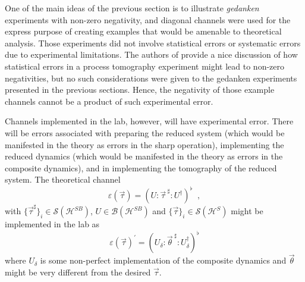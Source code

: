 One of the main ideas of the previous section is to illustrate {\em gedanken} experiments with non-zero negativity, and diagonal channels were used for the express purpose of creating examples that would be amenable to theoretical analysis.  Those experiments did not involve statistical errors or systematic errors due to experimental limitations.  The authors of \cite{Wood2009} provide a nice discussion of how statistical errors in a process tomography experiment might lead to non-zero negativities, but no such considerations were given to the gedanken experiments presented in the previous sections.  Hence, the negativity of those example channels cannot be a product of such experimental error.  

Channels implemented in the lab, however, will have experimental error.  There will be errors associated with preparing the reduced system (which would be manifested in the theory as errors in the sharp operation), implementing the reduced dynamics (which would be manifested in the theory as errors in the composite dynamics), and in implementing the tomography of the reduced system.  The theoretical channel
$$
\varepsilon(\vec{\tau})=\left(U:\vec{\tau}^{\;\sharp}:U^\dagger\right)^\flat\;\;,
$$
with $\{\vec{\tau}^\sharp\}_i\in\mathcal{S}(\mathcal{H}^{SB})$, $U\in\mathcal{B}(\mathcal{H}^{SB})$ and $\{\vec{\tau}\}_i\in\mathcal{S}(\mathcal{H}^{S})$ might be implemented in the lab as
$$
\varepsilon(\vec{\tau})^\prime = \left( U_\delta:\vec{\theta}^{\;\sharp}:U_\delta^\dagger\right)^\flat
$$
where $U_\delta$ is some non-perfect implementation of the composite dynamics and $\vec{\theta}$ might be very different from the desired $\vec{\tau}$.  

